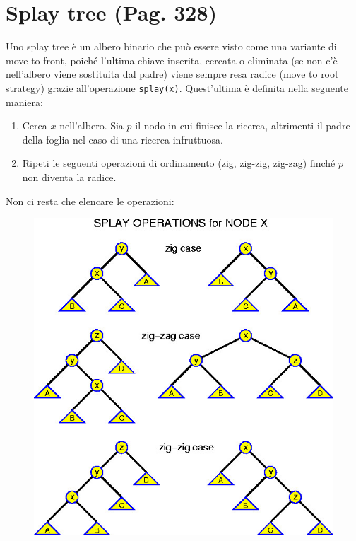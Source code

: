 \documentclass[a4paper]{book}
\newcommand{\inline}[1]{\lstinline!#1!}%
\begin{document}
\section{Splay tree (Pag. 328)}
Uno splay tree è un albero binario che può essere visto come una variante di move to front, poiché l'ultima chiave inserita, cercata o eliminata (se non c'è nell'albero viene sostituita dal padre) viene sempre resa radice (move to root strategy) grazie all'operazione \inline{splay(x)}. Quest'ultima è definita nella seguente maniera:
\begin{enumerate}
\item Cerca $x$ nell'albero. Sia $p$ il nodo in cui finisce la ricerca, altrimenti il padre della foglia nel caso di una ricerca infruttuosa.
\item Ripeti le seguenti operazioni di ordinamento (zig, zig-zig, zig-zag) finché $p$ non diventa la radice.
\end{enumerate}
Non ci resta che elencare le operazioni:
\begin{figure}[H]
\centering
\includegraphics[scale=0.5]{Figures/splay.jpg}
\end{figure}
\end{document}
